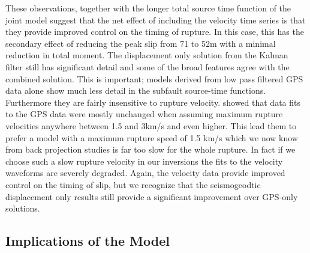 These observations, together with the longer total source time function of the joint model suggest that the net effect of including the velocity time series is that they provide improved control on the timing of rupture. In this case, this has the secondary effect of reducing the peak slip from 71 to 52m with a minimal reduction in total moment. The displacement only solution from the Kalman filter still has significant detail and some of the broad features agree with the combined solution. This is important; models derived from low pass filtered GPS data alone \citep{yue2011} show much less detail in the subfault source-time functions. Furthermore they are fairly insensitive to rupture velocity. \citet{yue2011} showed that data fits to the GPS data were mostly unchanged when assuming maximum rupture velocities anywhere between 1.5 and 3km/s and even higher. This lead them to prefer a model with a maximum rupture speed of 1.5 km/s which we now know from back projection studies \citep{wang2011bp,kiser2012} is far too slow for the whole rupture. In fact if we choose such a slow rupture velocity in our inversions the fits to the velocity waveforms are severely degraded. Again, the velocity data provide improved control on the timing of slip, but we recognize that the seismogeodtic displacement only results still provide a significant improvement over GPS-only solutions.

\FloatBarrier


\subsection{Implications of the Model}

